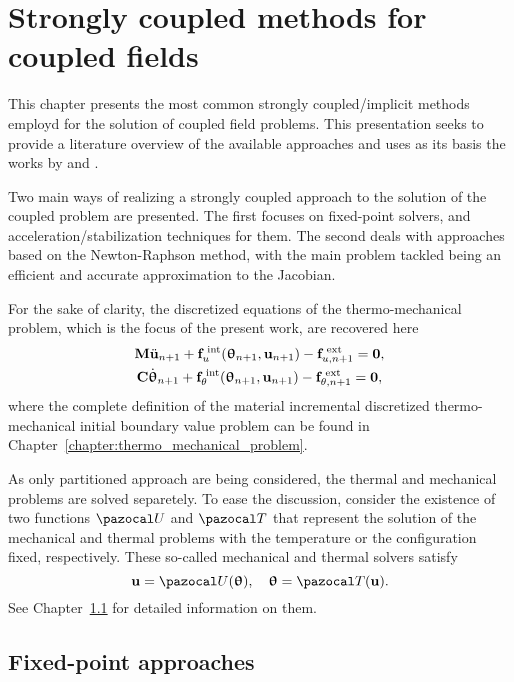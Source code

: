 \chapter{Strongly coupled methods for coupled fields}

This chapter presents the most common strongly coupled/implicit methods employd for the solution of coupled field problems.
This presentation seeks to provide a literature overview of the available approaches and uses as its basis the works by \cite{gatzhammer_efficient_2014} and \cite{uekerman}.

Two main ways of realizing a strongly coupled approach to the solution of the coupled problem are presented.
The first focuses on fixed-point solvers, and acceleration/stabilization techniques for them.
The second deals with approaches based on the Newton-Raphson method, with the main problem tackled being an efficient and accurate approximation to the Jacobian.

For the sake of clarity, the discretized equations of the thermo-mechanical problem, which is the focus of the present work, are recovered here
\begin{gather}
    \mathbf M \ddot{\mathbf u}_{n+1} +\mathbf f_u^\text{\;int}(\bm \uptheta_{n+1}, \mathbf u_{n+1})-\mathbf f^\text{\;ext}_{u,n+1}=\mathbf 0, \label{eq:mech_problem}\\
    \mathbf C \dot{\bm \uptheta}_{n+1} +\mathbf f_\theta^\text{\;int}(\bm \uptheta_{n+1}, \mathbf u_{n+1})-\mathbf f^\text{\;ext}_{\theta,n+1}=\mathbf 0, \label{eq:therm_problem}
\end{gather}
where the complete definition of the material incremental discretized thermo-mechanical initial boundary value problem can be found in Chapter~\ref{chapter:thermo_mechanical_problem}.

As only partitioned approach are being considered, the thermal and mechanical problems are solved separetely.
To ease the discussion, consider the existence of two functions \(\pazocal U\) and \(\pazocal T\) that represent the solution of the mechanical and thermal problems with the temperature or the configuration fixed, respectively.
These so-called mechanical and thermal solvers satisfy
\begin{equation}
  \mathbf u = \pazocal U(\bm \uptheta),\quad
  \bm \uptheta = \pazocal T(\mathbf u).
\end{equation}
See Chapter~\ref{} for detailed information on them.


\section{Fixed-point approaches}

